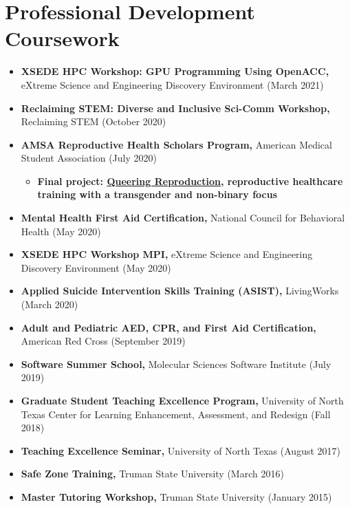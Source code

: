 \documentclass[letterpaper,11pt]{article}
\newcommand{\resumeItem}[2]{
  \item\small{
    \textbf{#1}{ #2 \vspace{-2pt}}
  }
}
\newcommand{\resumeSubItem}[2]{\resumeItem{#1}{#2}\vspace{-4pt}}
\newcommand{\resumeSubHeadingListStart}{\begin{itemize}[leftmargin=*]}
\newcommand{\resumeSubHeadingListEnd}{\end{itemize}}
\newcommand{\resumeItemListStart}{\begin{itemize}}
\newcommand{\resumeItemListEnd}{\end{itemize}\vspace{-5pt}}
\begin{document}
\section{Professional Development Coursework}
  \resumeSubHeadingListStart
    \resumeSubItem{XSEDE HPC Workshop: GPU Programming Using OpenACC\textnormal{,}}
      {eXtreme Science and Engineering Discovery Environment (March 2021)} %
    \resumeSubItem{Reclaiming STEM: Diverse and Inclusive Sci-Comm Workshop\textnormal{,}}
      {Reclaiming STEM (October 2020)}
    \resumeSubItem{AMSA Reproductive Health Scholars Program\textnormal{,}}
      {American Medical Student Association (July 2020)}
      \resumeItemListStart
      \resumeItem{\textnormal{Final project: \href{https://queeringreproduction.com}{Queering Reproduction}, reproductive healthcare training with a transgender and non-binary focus}}
        {}
       \resumeItemListEnd
    \resumeSubItem{Mental Health First Aid Certification\textnormal{,}}
      {National Council for Behavioral Health (May 2020)}
    \resumeSubItem{XSEDE HPC Workshop MPI\textnormal{,}}
      {eXtreme Science and Engineering Discovery Environment (May 2020)}  
    \resumeSubItem{Applied Suicide Intervention Skills Training (ASIST)\textnormal{,}}
      {LivingWorks (March 2020)}
    \resumeSubItem{Adult and Pediatric AED, CPR, and First Aid Certification\textnormal{,}}
      {American Red Cross (September 2019)}
    \resumeSubItem{Software Summer School\textnormal{,}}
      {Molecular Sciences Software Institute (July 2019)}
    \resumeSubItem{Graduate Student Teaching Excellence Program\textnormal{,}}
      {University of North Texas Center for Learning Enhancement, Assessment, and Redesign (Fall 2018)}  
    \resumeSubItem{Teaching Excellence Seminar\textnormal{,}}
      {University of North Texas (August 2017)}
    \resumeSubItem{Safe Zone Training\textnormal{,}}
      {Truman State University (March 2016)}
    \resumeSubItem{Master Tutoring Workshop\textnormal{,}}
      {Truman State University (January 2015)}
  \resumeSubHeadingListEnd
\end{document}

